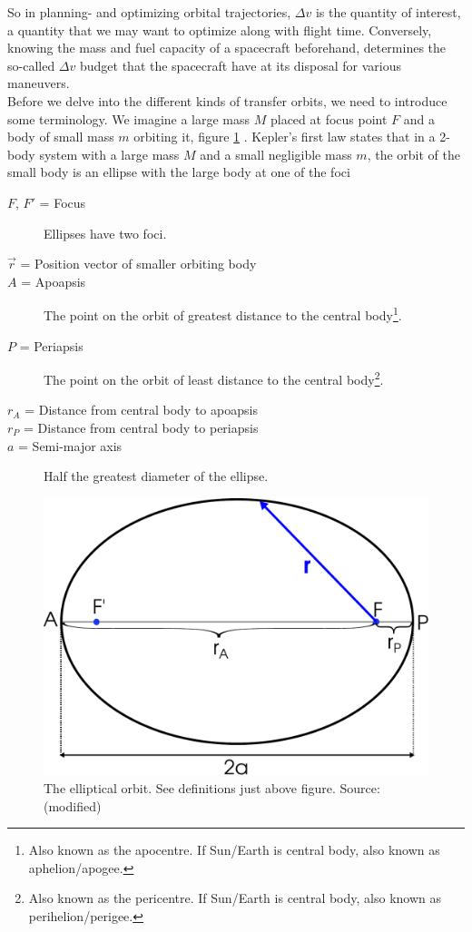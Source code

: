 So in planning- and optimizing orbital trajectories, $\Delta v$ is the quantity of interest, a quantity that we may want to optimize along with flight time. Conversely, knowing the mass and fuel capacity of a spacecraft beforehand, determines the so-called $\Delta v$ budget that the spacecraft have at its disposal for various maneuvers.
\\
Before we delve into the different kinds of transfer orbits, we need to introduce some terminology. We imagine a large mass $M$ placed at focus point $F$ and a body of small mass $m$ orbiting it, figure \ref{fig:ellipse} \cite{Murray1999}. Kepler's first law states that in a 2-body system with a large mass $M$ and a small negligible mass $m$, the orbit of the small body is an ellipse with the large body at one of the foci \cite{Knudsen2002}
\begin{description}
    \item[$F$, $F'$ = Focus] Ellipses have two foci.
    \item[$\vec{r}$ = Position vector of smaller orbiting body]
    \item[$A$ = Apoapsis] The point on the orbit of greatest distance to the central body\footnote{Also known as the apocentre. If Sun/Earth is central body, also known as aphelion/apogee.}.
    \item[$P$ = Periapsis] The point on the orbit of least distance to the central body\footnote{Also known as the pericentre. If Sun/Earth is central body, also known as perihelion/perigee.}.
    \item[$r_A$ = Distance from central body to apoapsis]
    \item[$r_P$ = Distance from central body to periapsis]
    \item[$a$ = Semi-major axis] Half the greatest diameter of the ellipse.
\end{description}

\begin{figure}[ht!]
\centering
\includegraphics[scale=0.51]{fig/ellipse.pdf}
\caption{The elliptical orbit. See definitions just above figure. Source: \cite{fig-ellipse} (modified)}
\label{fig:ellipse}
\end{figure}


